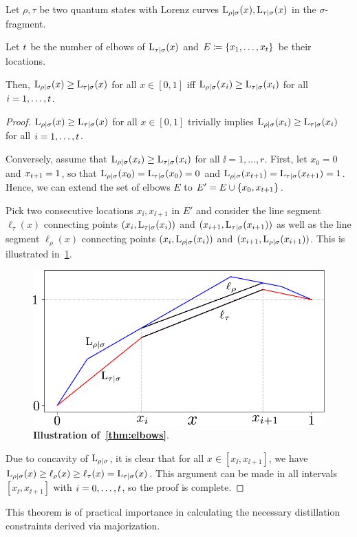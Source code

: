 \begin{theorem}
	Let $\rho, \tau$ be two quantum states with Lorenz curves $\lc{\rho}{\sigma}(x), \lc{\tau}{\sigma}(x)$ in the $\sigma$-fragment.
	
	Let $\tt$ be the number of elbows of $\lc{\tau}{\sigma}(x)$ and $E \coloneqq \{x_1, \dots, x_\tt\}$ be their locations.
	
	Then, $\lc{\rho}{\sigma}(x) \geq \lc{\tau}{\sigma}(x)$ for all $x \in [0,1]$ iff $\lc{\rho}{\sigma}(x_{\ii}) \geq \lc{\tau}{\sigma}(x_{\ii})$ for all $\ii =1,\dots,\tt$.
\end{theorem}
\begin{proof}	
	$\lc{\rho}{\sigma}(x) \geq \lc{\tau}{\sigma}(x)$ for all $x \in [0,1]$ trivially implies $\lc{\rho}{\sigma}(x_{\ii}) \geq \lc{\tau}{\sigma}(x_{\ii})$ for all $\ii = 1,\dots,\tt$.
	
	Conversely, assume that $\lc{\rho}{\sigma}(x_{\ii}) \geq \lc{\tau}{\sigma}(x_{\ii})$ for all $\ii = 1,\dots,r$.
	First, let $x_0 = 0$ and $x_{\tt+1} = 1$, so that $\lc{\rho}{\sigma}(x_0) = \lc{\tau}{\sigma}(x_0) = 0$ and $\lc{\rho}{\sigma}(x_{\tt+1}) = \lc{\tau}{\sigma}(x_{\tt+1}) = 1$.
	Hence, we can extend the set of elbows $E$ to $E' = E \cup \{x_0, x_{\tt+1}\}$.
	
	Pick two consecutive locations $x_{\ii}, x_{\ii+1}$ in $E'$ and consider the line segment $\ell_\tau(x)$ connecting points $(x_{\ii}, \lc{\tau}{\sigma}(x_{\ii}))$ and $(x_{\ii+1}, \lc{\tau}{\sigma}(x_{\ii+1}))$ as well as the line segment $\ell_\rho(x)$ connecting points $(x_{\ii}, \lc{\rho}{\sigma}(x_{\ii}))$ and $(x_{\ii+1}, \lc{\rho}{\sigma}(x_{\ii+1}))$.
	This is illustrated in~\cref{fig:elbows_proof}.
\begin{figure}[h]
    \centering
    \includegraphics[scale=0.6]{figs/elbows_proof.pdf}
    \caption{\textbf{Illustration of~\cref{thm:elbows}}.
    }
    \label{fig:elbows_proof}
\end{figure}

	Due to concavity of $\lc{\rho}{\sigma}$, it is clear that for all $x \in [x_{\ii}, x_{\ii+1}]$, we have $\lc{\rho}{\sigma}(x) \geq \ell_\rho(x) \geq \ell_\tau(x) = \lc{\tau}{\sigma}(x)$.
	This argument can be made in all intervals $[x_{\ii}, x_{\ii+1}]$ with $\ii=0,\dots,\tt$, so the proof is complete.
\end{proof}
This theorem is of practical importance in calculating the necessary distillation constraints derived via majorization.




